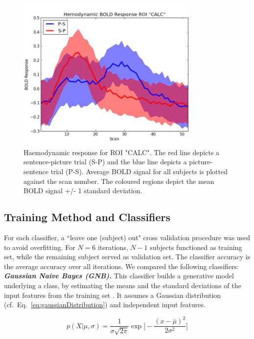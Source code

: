 \documentclass[preprint,journal,11pt]{vgtc}
\begin{document}
\begin{figure}
	\centering
	\includegraphics[width=90mm]{figures/scan_hemodynamic_BOLD_roi}
  	\caption{Haemodynamic response for ROI "CALC". The red line depicts a sentence-picture trial (S-P) and the blue line depicts a picture-sentence trial (P-S). Average BOLD signal for all subjects is plotted against the scan number. The coloured regions depict the mean BOLD signal +/- 1 standard deviation.}
  	\label{fig:boldroi}
\end{figure}

\subsection{Training Method and Classifiers}
\label{sec:trainingMethodsAndClassifiers}

For each classifier, a ``leave one (subject) out" cross validation procedure was used to avoid overfitting. For $N=6$ iterations, $N-1$ subjects functioned as training set, while the remaining subject served as validation set. The classifier accuracy is the average accuracy over all iterations. We compared the following classifiers:\\

\textbf{\emph{Gaussian Naive Bayes (GNB).}} This classifier builds a generative model underlying a class, by estimating the means and the standard deviations of the input features from the training set \cite{bk:2004aplay}. It assumes a Gaussian distribution (cf.~Eq.~\ref{eq:gaussianDistribution}) and independent input features.

\begin{equation}
\label{eq:gaussianDistribution}
p(X|\mu, \sigma) = \frac{1}{\sigma\sqrt{2\pi}}\exp\Big[-\frac{(x - \bar{\mu})^2}{2\sigma^2}\Big]
\end{equation}
\end{document}
